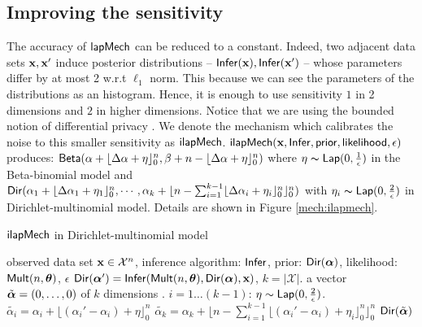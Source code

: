 \documentclass{article}
\begin{document}
\subsection{Improving the sensitivity}
 The accuracy of $\mathsf{lapMech}$ can be reduced to a constant.
 Indeed, two adjacent data sets $\textbf{x}, \textbf{x}'$  induce posterior distributions -- $\mathsf{Infer}(\textbf{x}), \mathsf{Infer}(\textbf{x}')$ --
 whose parameters differ by at most 2 w.r.t $\ell_1$ norm. This because we can see the parameters of the distributions as an histogram.
 Hence, it is enough to use sensitivity $1$ in 2 dimensions and $2$ in higher dimensions.
 {\color{red} Notice that we are using the bounded notion of differential privacy \cite{????}.}
 We denote the mechanism which calibrates the noise to this smaller sensitivity as $\mathsf{ilapMech}$.
 $\mathsf{ilapMech}(\textbf{x},\mathsf{Infer}, \mathsf{prior}, \mathsf{likelihood}, \epsilon)$ produces:
 $\mathsf{Beta}(\alpha +  \lfloor{\Delta \alpha + \eta}\rfloor^n_0,\beta + n - \lfloor{\Delta \alpha + \eta}\rfloor^n_0) $
 where $\eta \thicksim \mathsf{Lap}(0, \frac{1}{\epsilon})$ in the Beta-binomial model and
 $\mathsf{Dir}(\alpha_1 +  \lfloor{\Delta \alpha_1 + \eta_1}\rfloor^n_0, \cdots,  \alpha_k + \lfloor n - \sum_{i = 1}^{k-1}\lfloor{\Delta \alpha_i + \eta_i}\rfloor^n_0 \rfloor^n_0)$
 with $\eta_i \thicksim \mathsf{Lap}(0, \frac{2}{\epsilon})$ in Dirichlet-multinomial model. Details are shown in Figure \ref{mech:ilapmech}.
  \begin{algorithm}
  \caption{$\mathsf{ilapMech}$ in Dirichlet-multinomial model}
  \label{mech:ilapmech}
  \begin{algorithmic}
  \REQUIRE observed data set $\textbf{x} \in \mathcal{X}^n$, inference algorithm: $\mathsf{Infer}$, 
  prior: $\mathsf{Dir}(\boldsymbol{\alpha})$, likelihood: $\mathsf{Mult}(n, \boldsymbol{\theta})$, $\epsilon$
  \STATE {} $\mathsf{Dir}(\boldsymbol{\alpha}') = \mathsf{Infer}(\mathsf{Mult}(n, \boldsymbol{\theta}), \mathsf{Dir}(\boldsymbol{\alpha}), \textbf{x})$, $k = |\mathcal{X}|$.
  \STATE {} a vector $\tilde{\boldsymbol{\alpha}} = (0, \dots, 0 )$ of $k$ dimensions .
  \STATE {} $i = 1 \dots (k - 1)$:
  \STATE \quad {} $\eta \sim \mathsf{Lap}(0, \frac{2}{\epsilon})$.
  \STATE \quad \quad  $\tilde{\alpha_i}=\alpha_i + \lfloor{(\alpha_i' - \alpha_i) + \eta}\rfloor^n_0$ 
  \STATE \quad $\tilde{\alpha_k} = \alpha_k + \lfloor n - \sum_{i = 1}^{k-1}\lfloor{(\alpha_i' - \alpha_i) + \eta_i}\rfloor^n_0 \rfloor^n_0$
  \ENSURE $\mathsf{Dir}(\tilde{\boldsymbol{\alpha}})$
  \end{algorithmic}
  \end{algorithm}
\end{document}
